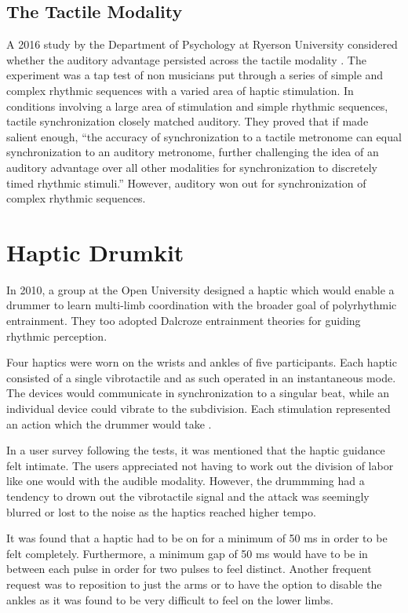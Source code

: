 \subsection{The Tactile Modality} \label{tactileModality}
A 2016 study by the Department of Psychology at Ryerson University considered whether the auditory advantage persisted across the tactile modality \cite{ammirante2016synchronizing}. The experiment was a tap test of non musicians put through a series of simple and complex rhythmic sequences with a varied area of haptic stimulation. In conditions involving a large area of stimulation and simple rhythmic sequences, tactile synchronization closely matched auditory. They proved that if made salient enough, “the accuracy of synchronization to a tactile metronome can equal synchronization to an auditory metronome, further challenging the idea of an auditory advantage over all other modalities for synchronization to discretely timed rhythmic stimuli.” However, auditory won out for synchronization of complex rhythmic sequences.

\section{Haptic Drumkit} \label{HD}
In 2010, a group at the Open University designed a haptic which would enable a drummer to learn multi-limb coordination with the broader goal of polyrhythmic entrainment. They too adopted Dalcroze entrainment theories for guiding rhythmic perception. 

Four haptics were worn on the wrists and ankles of five participants. Each haptic consisted of a single vibrotactile and as such operated in an instantaneous mode. The devices would communicate in synchronization to a singular beat, while an individual device could vibrate to the subdivision. Each stimulation represented an action which the drummer would take \cite{holland2010feeling}.

In a user survey following the tests, it was mentioned that the haptic guidance felt intimate. The users appreciated not having to work out the division of labor like one would with the audible modality. However, the drummming had a tendency to drown out the vibrotactile signal and the attack was seemingly blurred or lost to the noise as the haptics reached higher tempo. 

It was found that a haptic had to be on for a minimum of 50 ms in order to be felt completely. Furthermore, a minimum gap of 50 ms would have to be in between each pulse in order for two pulses to feel distinct. Another frequent request was to reposition to just the arms or to have the option to disable the ankles as it was found to be very difficult to feel on the lower limbs.

